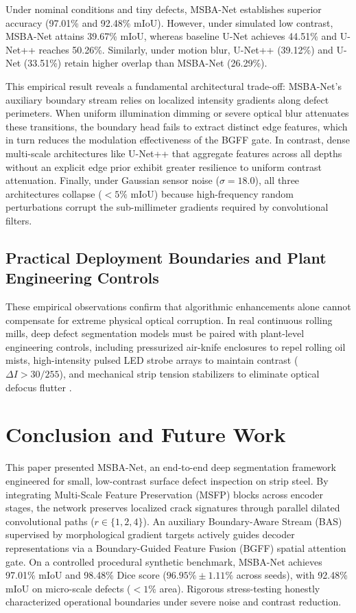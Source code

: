 \documentclass{ieeeaccess}
\begin{document}
Under nominal conditions and tiny defects, MSBA-Net establishes superior accuracy (97.01\% and 92.48\% mIoU). However, under simulated low contrast, MSBA-Net attains 39.67\% mIoU, whereas baseline U-Net achieves 44.51\% and U-Net++ reaches 50.26\%. Similarly, under motion blur, U-Net++ (39.12\%) and U-Net (33.51\%) retain higher overlap than MSBA-Net (26.29\%).

This empirical result reveals a fundamental architectural trade-off: MSBA-Net's auxiliary boundary stream relies on localized intensity gradients along defect perimeters. When uniform illumination dimming or severe optical blur attenuates these transitions, the boundary head fails to extract distinct edge features, which in turn reduces the modulation effectiveness of the BGFF gate. In contrast, dense multi-scale architectures like U-Net++ that aggregate features across all depths without an explicit edge prior exhibit greater resilience to uniform contrast attenuation. Finally, under Gaussian sensor noise ($\sigma = 18.0$), all three architectures collapse ($<5\%$ mIoU) because high-frequency random perturbations corrupt the sub-millimeter gradients required by convolutional filters.

\subsection{Practical Deployment Boundaries and Plant Engineering Controls}
These empirical observations confirm that algorithmic enhancements alone cannot compensate for extreme physical optical corruption. In real continuous rolling mills, deep defect segmentation models must be paired with plant-level engineering controls, including pressurized air-knife enclosures to repel rolling oil mists, high-intensity pulsed LED strobe arrays to maintain contrast ($\Delta I > 30/255$), and mechanical strip tension stabilizers to eliminate optical defocus flutter \cite{satyanarayanan2017edge}.

\section{Conclusion and Future Work}
\label{sec:conclusion_future}
This paper presented MSBA-Net, an end-to-end deep segmentation framework engineered for small, low-contrast surface defect inspection on strip steel. By integrating Multi-Scale Feature Preservation (MSFP) blocks across encoder stages, the network preserves localized crack signatures through parallel dilated convolutional paths ($r \in \{1, 2, 4\}$). An auxiliary Boundary-Aware Stream (BAS) supervised by morphological gradient targets actively guides decoder representations via a Boundary-Guided Feature Fusion (BGFF) spatial attention gate. On a controlled procedural synthetic benchmark, MSBA-Net achieves 97.01\% mIoU and 98.48\% Dice score ($96.95\% \pm 1.11\%$ across seeds), with 92.48\% mIoU on micro-scale defects ($<1\%$ area). Rigorous stress-testing honestly characterized operational boundaries under severe noise and contrast reduction.
\end{document}
